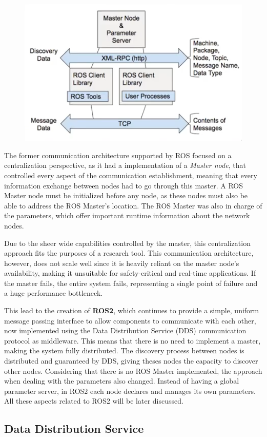 \begin{figure}[H]
        \centering
         \includegraphics[width=0.5\linewidth]{images/former-ros1-architecture.png}
\end{figure}

The former communication architecture supported by ROS focused on a centralization perspective, as it had a implementation of a \textit{Master node}, that controlled every aspect of the communication establishment, meaning that every information exchange between nodes had to go through this master. A ROS Master node must be initialized before any node, as these nodes must also be able to address the ROS Master's location. The ROS Master was also in charge of the parameters, which offer important runtime information about the network nodes.

Due to the sheer wide capabilities controlled by the master, this centralization approach fits the purposes of a research tool. This communication architecture, however, does not scale well since it is heavily reliant on the master node's availability, making it unsuitable for safety-critical and real-time applications. If the master fails, the entire system fails, representing a single point of failure and a huge performance bottleneck.

This lead to the creation of \textbf{ROS2}, which continues to provide a simple, uniform message passing interface to allow components to communicate with each other, now implemented using the Data Distribution Service (DDS) communication protocol as middleware. This means that there is no need to implement a master, making the system fully distributed. The discovery process between nodes is distributed and guaranteed by DDS, giving theses nodes the capacity to discover other nodes. Considering that there is no ROS Master implemented, the approach when dealing with the parameters also changed. Instead of having a global parameter server, in ROS2 each node declares and manages its own parameters. All these aspects related to ROS2 will be later discussed.


\subsection{Data Distribution Service}

